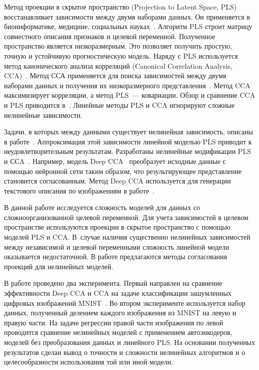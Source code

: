 \documentclass[12pt]{article}
\begin{document}
Метод проекции в скрытое пространство (Projection to Latent Space, PLS)~\cite{overview_pls, overview_nonlinear_pls} восстанавливает зависимости между двумя наборами данных. Он применяется в биоинформатике, медицине, социальных науках~\cite{1figures, btc519, PLS_in_strategic_management, PLS_application}. Алгоритм PLS строит матрицу совместного описания признаков и целевой переменной. Полученное пространство является низкоразмерным. Это позволяет получить простую, точную и устойчивую прогностическую модель. Наряду с PLS используется метод канонического анализа корреляций (Canonical Correlation Analysis, CCA)~\cite{cca_alg}. Метод ССА применяется для поиска зависимостей между двумя наборами данных и получения их низкоразмерного представления~\cite{cca_apl1, cca_apl2}. Метод CCA максимизирует корреляции, а метод PLS~--- ковариации. Обзор и сравнение CCA и PLS приводится в~\cite{overview_pls}. Линейные методы PLS и CCA игнорируют сложные нелинейные зависимости. 

Задачи, в которых между данными существует нелинейная зависимость, описаны в работе~\cite{overview_nonlinear_pls}. Аппроксимация этой зависимости линейной моделью PLS приводит к неудовлетворительным результатам. Разработаны нелинейные модификации PLS~\cite{PLS_nn, PLS_rbf, PLS_ga} и ССA~\cite{deep_cca, kernel_cca}. Например, модель Deep CCA~\cite{deep_cca} преобразует исходные данные с помощью нейронной сети таким образом, что результирующее представление становится согласованным. Метод Deep CCA используется для генерации текстового описания по изображениям в работе~\cite{kernel_cca_appl}. 

В данной работе исследуется сложность моделей для данных со сложноорганизованной целевой переменной. 
Для учета зависимостей в целевом пространстве используются проекции в скрытое пространство с помощью моделей PLS и CCA.
В~случае наличия существенно нелинейных зависимостей между независимой и целевой переменными сложность линейной модели оказывается недостаточной.
В работе предлагаются методы согласования проекций для нелинейных моделей.

В работе проведено два эксперимента. Первый направлен на сравнение эффективности Deep CCA и CCA на задаче классификации зашумленных цифровых изображений MNIST~\cite{MNIST}. Во втором эксперименте используется набор данных, полученный делением каждого изображения из MNIST на левую и правую части. На задаче регрессии правой части изображения по левой проводится сравнение нелинейных моделей с применением автоэнкодеров, моделей без преобразования данных и линейного PLS. На основании полученных результатов сделан вывод о точности и сложности нелинейных алгоритмов и о целесообразности использования той или иной модели.
\end{document}
